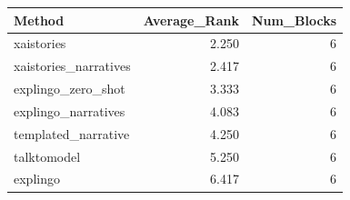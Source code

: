 \begin{tabular}{lrr}
\toprule
Method & Average_Rank & Num_Blocks \\
\midrule
xaistories & 2.250 & 6 \\
xaistories_narratives & 2.417 & 6 \\
explingo_zero_shot & 3.333 & 6 \\
explingo_narratives & 4.083 & 6 \\
templated_narrative & 4.250 & 6 \\
talktomodel & 5.250 & 6 \\
explingo & 6.417 & 6 \\
\bottomrule
\end{tabular}
